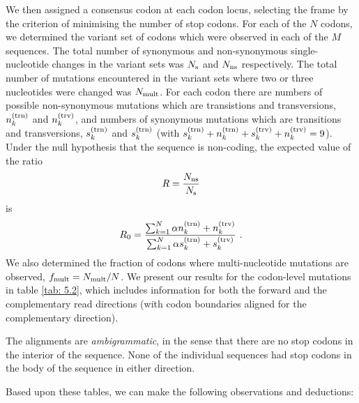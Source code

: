 \documentclass[unnumsec,webpdf,contemporary,large,namedate]{oup-authoring-template}%
\theoremstyle{thmstyleone}%
\theoremstyle{thmstyletwo}%
\theoremstyle{thmstylethree}%
\begin{document}
We then assigned a consensus codon at each codon locus, selecting the
frame by the criterion of minimising the number of stop codons.
For each of the $N$ codons, we determined the variant set of codons
which were observed in each of the $M$ sequences. The total
number of synonymous and non-synonymous single-nucleotide changes in the variant sets
was $N_{\rm s}$ and $N_{\rm ns}$ respectively. The total number of mutations
encountered in the variant sets where two or three nucleotides were changed was $N_{\rm mult}$.
For each codon there are
numbers of possible non-synonymous mutations which are transistions and transversions,
$n_k^{({\rm trn})}$ and $n_k^{({\rm trv})}$, and numbers of synonymous mutations
which are transitions and transversions, $s_k^{({\rm trn})}$ and $s_k^{({\rm trn})}$
(with $s_k^{({\rm trn})}+n_k^{({\rm trn})}+s_k^{({\rm trv})}+n_k^{({\rm trv})}=9$). Under the null
hypothesis that the sequence is non-coding, the expected value of the ratio
%
\begin{equation}
\label{eq: 5.2}
R=\frac{N_{\rm ns}}{N_{\rm s}}
\end{equation}
%
is
%
\begin{equation}
\label{eq: 5.3}
R_0=\frac{\sum_{k=1}^N\alpha n_k^{({\rm trn})}+n_k^{({\rm trv})}}
{\sum_{k=1}^N\alpha s_k^{({\rm trn})}+s_k^{({\rm trv})}}
\ .
\end{equation}
%
We also determined the fraction of codons where multi-nucleotide mutations are observed,
$f_{\rm mult}=N_{\rm mult}/N$.
We present our results for the codon-level mutations in table \ref{tab: 5.2}, which includes information
for both the forward and the complementary read directions (with codon boundaries aligned
for the complementary direction).

The alignments are \emph{ambigrammatic}, in the sense that there are no stop codons in the
interior of the sequence. None of the individual sequences had stop codons in the body of the
sequence in either direction.

Based upon these tables, we can make the following observations and deductions:
\end{document}
